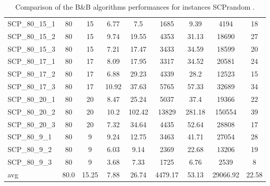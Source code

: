 \begin{table}[!ht]
{\begin{tabular}{lcccccccc}
SCP\_80\_15\_1 & 80 & 15 &  \textcolor{blue2}{6.77} & 7.5 & 1685 & 9.39 & 4194 & 18 \\
SCP\_80\_15\_2 & 80 & 15 &  \textcolor{blue2}{9.74} & 19.55 & 4353 & 31.13 & 18690 & 27 \\
SCP\_80\_15\_3 & 80 & 15 &  \textcolor{blue2}{7.21} & 17.47 & 3433 & 34.59 & 18599 & 20 \\
SCP\_80\_17\_1 & 80 & 17 &  \textcolor{blue2}{8.09} & 17.95 & 3317 & 34.52 & 20581 & 24 \\
SCP\_80\_17\_2 & 80 & 17 &  \textcolor{blue2}{6.88} & 29.23 & 4339 & 28.2 & 12523 & 15 \\
SCP\_80\_17\_3 & 80 & 17 &  \textcolor{blue2}{10.92} & 37.63 & 5765 & 57.33 & 32689 & 34 \\
SCP\_80\_20\_1 & 80 & 20 &  \textcolor{blue2}{8.47} & 25.24 & 5037 & 37.4 & 19366 & 22 \\
SCP\_80\_20\_2 & 80 & 20 &  \textcolor{blue2}{10.2} & 102.42 & 13829 & 281.18 & 150554 & 39 \\
SCP\_80\_20\_3 & 80 & 20 &  \textcolor{blue2}{7.32} & 34.64 & 4435 & 52.64 & 28808 & 17 \\
SCP\_80\_9\_1 & 80 & 9 &  \textcolor{blue2}{9.24} & 12.75 & 3463 & 41.71 & 27054 & 28 \\
SCP\_80\_9\_2 & 80 & 9 &  \textcolor{blue2}{6.03} & 9.14 & 2369 & 22.68 & 13206 & 19 \\
SCP\_80\_9\_3 & 80 & 9 &  \textcolor{blue2}{3.68} & 7.33 & 1725 & 6.76 & 2539 & 8 \\
\cline{1-9} avg & 80.0 & 15.25 & 7.88 & 26.74& 4479.17 & 53.13& 29066.92 & 22.58\\ \cline{1-9}
\bottomrule
\end{tabular}
}%
\caption{Comparison of the B\&B algorithms performances for instances SCPrandom .}
\label{tab:table_EPSILONvsBBvsEPBBB_SCPrandom }
\end{table}
